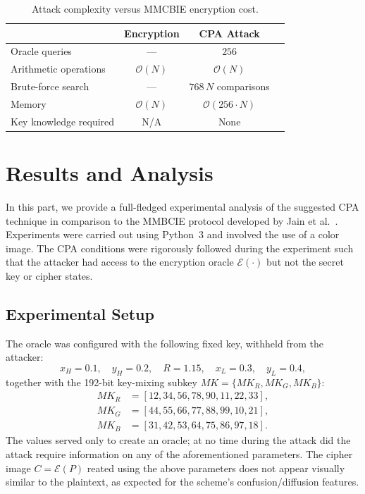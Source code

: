 \begin{table}[t]
\centering
\caption{Attack complexity versus MMCBIE encryption cost.}
\label{tab:complexity_mmcbie}
\begin{tabular}{lccc}
\toprule
                       & Encryption         & CPA Attack          \\
\midrule
Oracle queries         & ---                & $256$               \\
Arithmetic operations  & $\mathcal{O}(N)$   & $\mathcal{O}(N)$    \\
Brute-force search     & ---                & $768\,N$ comparisons\\
Memory                 & $\mathcal{O}(N)$   & $\mathcal{O}(256 \cdot N)$ \\
Key knowledge required & N/A                & None                \\
\bottomrule
\end{tabular}
\end{table}

\section{Results and Analysis}
In this part, we provide a full-fledged experimental analysis of the suggested CPA technique in comparison to the MMBCIE protocol developed by Jain et al.~\cite{jain2024mmcbie}. Experiments were carried out using Python~3 and involved the use of a color image. The CPA conditions were rigorously followed during the experiment such that the attacker had access to the encryption oracle $\mathcal{E}(\cdot)$ but not the secret key or cipher states.

\subsection{Experimental Setup}
\label{subsec:setup}

The oracle was configured with the following fixed key, withheld from the attacker:
\begin{equation}
    x_H = 0.1,\quad y_H = 0.2,\quad R = 1.15,\quad x_L = 0.3,\quad y_L = 0.4,
    \label{eq:exp_key}
\end{equation}
together with the 192-bit key-mixing subkey $MK = \{MK_R, MK_G, MK_B\}$:
\begin{equation}
\begin{aligned}
MK_R &= [12, 34, 56, 78, 90, 11, 22, 33],\\
MK_G &= [44, 55, 66, 77, 88, 99, 10, 21],\\
MK_B &= [31, 42, 53, 64, 75, 86, 97, 18].
\end{aligned}
\end{equation}
The values served only to create an oracle; at no time during the attack did the attack require information on any of the aforementioned parameters.  The cipher image $C = \mathcal{E}(P)$ reated using the above parameters does not appear visually similar to the plaintext, as expected for the scheme’s confusion/diffusion features.


